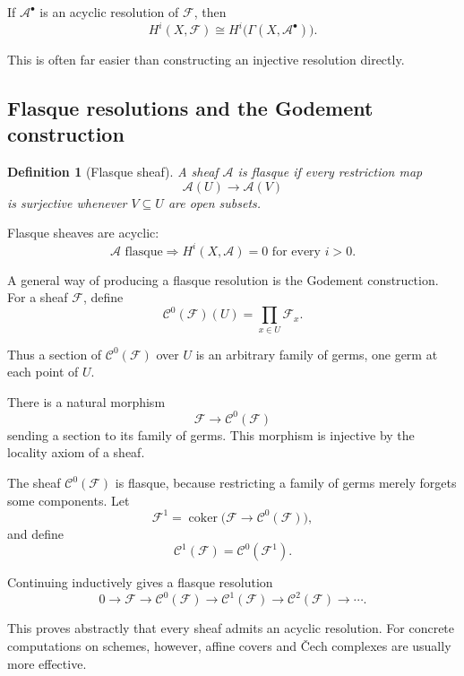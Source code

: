 \documentclass[12pt,a4paper]{article}
\theoremstyle{notespace}
\newtheorem{definition}{Definition}[subsection]
\begin{document}
If \(\mathcal{A}^{\bullet}\) is an acyclic resolution of \(\mathcal{F}\),
then
\[
\boxed{
	H^{i}(X,\mathcal{F})
	\cong
	H^{i}\bigl(\Gamma(X,\mathcal{A}^{\bullet})\bigr).
}
\]

This is often far easier than constructing an injective resolution directly.

\subsection{Flasque resolutions and the Godement construction}

\begin{definition}[Flasque sheaf]
	A sheaf \(\mathcal{A}\) is \emph{flasque} if every restriction map
	\[
	\mathcal{A}(U)\longrightarrow \mathcal{A}(V)
	\]
	is surjective whenever \(V\subseteq U\) are open subsets.
\end{definition}

Flasque sheaves are acyclic:
\[
\boxed{
	\mathcal{A}\text{ flasque}
	\Longrightarrow
	H^{i}(X,\mathcal{A})=0
	\text{ for every }i>0.
}
\]

A general way of producing a flasque resolution is the Godement
construction. For a sheaf \(\mathcal{F}\), define
\[
\mathcal{C}^{0}(\mathcal{F})(U)
=
\prod_{x\in U}\mathcal{F}_{x}.
\]

Thus a section of \(\mathcal{C}^{0}(\mathcal{F})\) over \(U\) is an
arbitrary family of germs, one germ at each point of \(U\).

There is a natural morphism
\[
\mathcal{F}
\longrightarrow
\mathcal{C}^{0}(\mathcal{F})
\]
sending a section to its family of germs. This morphism is injective by the
locality axiom of a sheaf.

The sheaf \(\mathcal{C}^{0}(\mathcal{F})\) is flasque, because restricting a
family of germs merely forgets some components. Let
\[
\mathcal{F}^{1}
=
\operatorname{coker}
\bigl(
\mathcal{F}\to \mathcal{C}^{0}(\mathcal{F})
\bigr),
\]
and define
\[
\mathcal{C}^{1}(\mathcal{F})
=
\mathcal{C}^{0}(\mathcal{F}^{1}).
\]

Continuing inductively gives a flasque resolution
\[
0
\longrightarrow
\mathcal{F}
\longrightarrow
\mathcal{C}^{0}(\mathcal{F})
\longrightarrow
\mathcal{C}^{1}(\mathcal{F})
\longrightarrow
\mathcal{C}^{2}(\mathcal{F})
\longrightarrow
\cdots.
\]

This proves abstractly that every sheaf admits an acyclic resolution.
For concrete computations on schemes, however, affine covers and
Čech complexes are usually more effective.
\end{document}
